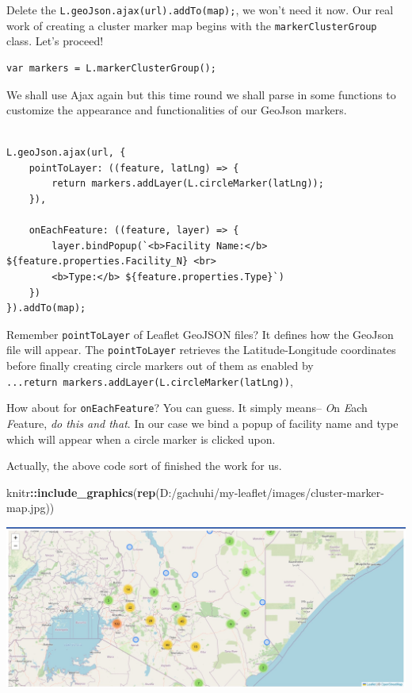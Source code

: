 \documentclass[
]{book}
\newenvironment{Shaded}{\begin{snugshade}}{\end{snugshade}}
\newcommand{\FunctionTok}[1]{\textcolor[rgb]{0.13,0.29,0.53}{\textbf{#1}}}
\newcommand{\NormalTok}[1]{#1}
\newcommand{\SpecialCharTok}[1]{\textcolor[rgb]{0.81,0.36,0.00}{\textbf{#1}}}
\newcommand{\StringTok}[1]{\textcolor[rgb]{0.31,0.60,0.02}{#1}}
\begin{document}
Delete the \texttt{L.geoJson.ajax(url).addTo(map);}, we won't need it now. Our real work of creating a cluster marker map begins with the \texttt{markerClusterGroup} class. Let's proceed!

\begin{verbatim}
var markers = L.markerClusterGroup();
\end{verbatim}

We shall use Ajax again but this time round we shall parse in some functions to customize the appearance and functionalities of our GeoJson markers.

\begin{verbatim}

L.geoJson.ajax(url, {
    pointToLayer: ((feature, latLng) => {
        return markers.addLayer(L.circleMarker(latLng));
    }),

    onEachFeature: ((feature, layer) => {
        layer.bindPopup(`<b>Facility Name:</b> ${feature.properties.Facility_N} <br>
        <b>Type:</b> ${feature.properties.Type}`)
    })
}).addTo(map);
\end{verbatim}

Remember \texttt{pointToLayer} of Leaflet GeoJSON files? It defines how the GeoJson file will appear. The \texttt{pointToLayer} retrieves the Latitude-Longitude coordinates before finally creating circle markers out of them as enabled by \texttt{...return\ markers.addLayer(L.circleMarker(latLng))},

How about for \texttt{onEachFeature}? You can guess. It simply means-- \emph{O}n \emph{E}ach \emph{F}eature, \emph{do this and that}. In our case we bind a popup of facility name and type which will appear when a circle marker is clicked upon.

Actually, the above code sort of finished the work for us.

\begin{Shaded}
\begin{Highlighting}[]
\NormalTok{knitr}\SpecialCharTok{::}\FunctionTok{include\_graphics}\NormalTok{(}\FunctionTok{rep}\NormalTok{(}\StringTok{\textquotesingle{}D:/gachuhi/my{-}leaflet/images/cluster{-}marker{-}map.jpg\textquotesingle{}}\NormalTok{))}
\end{Highlighting}
\end{Shaded}

\includegraphics{../images/cluster-marker-map.jpg}
\end{document}
